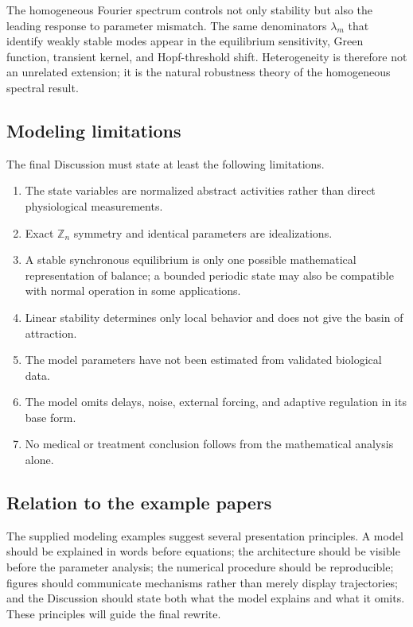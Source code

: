 \documentclass[11pt, reqno]{amsart}
\theoremstyle{definition}
\theoremstyle{remark}
\newcommand{\Z}{\mathbb{Z}}
\begin{document}
	The homogeneous Fourier spectrum controls not only stability but also the
	leading response to parameter mismatch.  The same denominators $\lambda_m$
	that identify weakly stable modes appear in the equilibrium sensitivity, Green
	function, transient kernel, and Hopf-threshold shift.  Heterogeneity is
	therefore not an unrelated extension; it is the natural robustness theory of
	the homogeneous spectral result.
	
	\subsection{Modeling limitations}
	
	The final Discussion must state at least the following limitations.
	
	\begin{enumerate}[label=(\arabic*),leftmargin=2.5em]
		\item The state variables are normalized abstract activities rather than
		direct physiological measurements.
		
		\item Exact $\Z_n$ symmetry and identical parameters are idealizations.
		
		\item A stable synchronous equilibrium is only one possible mathematical
		representation of balance; a bounded periodic state may also be compatible
		with normal operation in some applications.
		
		\item Linear stability determines only local behavior and does not give the
		basin of attraction.
		
		\item The model parameters have not been estimated from validated
		biological data.
		
		\item The model omits delays, noise, external forcing, and adaptive
		regulation in its base form.
		
		\item No medical or treatment conclusion follows from the mathematical
		analysis alone.
	\end{enumerate}
	
	\subsection{Relation to the example papers}
	
	The supplied modeling examples suggest several presentation principles.  A
	model should be explained in words before equations; the architecture should
	be visible before the parameter analysis; the numerical procedure should be
	reproducible; figures should communicate mechanisms rather than merely display
	trajectories; and the Discussion should state both what the model explains and
	what it omits.  These principles will guide the final rewrite.
	
\end{document}
